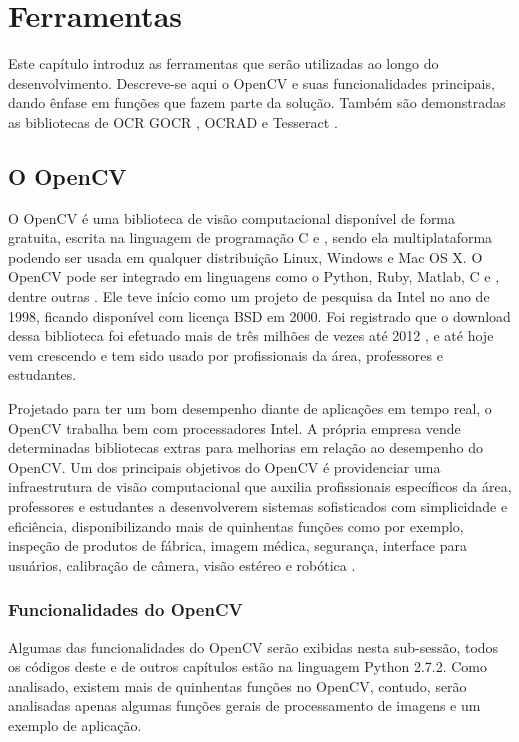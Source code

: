 \chapter{Ferramentas}

Este capítulo introduz as ferramentas que serão utilizadas ao longo do desenvolvimento. Descreve-se aqui o OpenCV e suas funcionalidades principais, dando ênfase em funções que fazem parte da solução. Também são demonstradas as bibliotecas de OCR GOCR \cite{GOCR}, OCRAD \cite{OCRAD} e Tesseract \cite{tesseract-ocr}.

\section{O OpenCV}

O OpenCV é uma biblioteca de visão computacional disponível de forma gratuita, escrita na linguagem de programação C e \cpp, sendo ela multiplataforma podendo ser usada em qualquer distribuição Linux, Windows e Mac OS X. O OpenCV pode ser integrado em linguagens como o Python, Ruby, Matlab, C e \cpp, dentre outras \cite{learningopencv}. Ele teve início como um projeto de pesquisa da Intel \cite{intel} no ano de 1998, ficando disponível com licença BSD em 2000. Foi registrado que o download dessa biblioteca foi efetuado mais de três milhões de vezes até 2012 \cite{pulli2012real}, e até hoje vem crescendo e tem sido usado por profissionais da área, professores e estudantes.

Projetado para ter um bom desempenho diante de aplicações em tempo real, o OpenCV trabalha bem com processadores Intel. A própria empresa vende determinadas bibliotecas extras para melhorias em relação ao desempenho do OpenCV. Um dos principais objetivos do OpenCV é providenciar uma infraestrutura de visão computacional que auxilia profissionais específicos da área, professores e estudantes a desenvolverem sistemas sofisticados com simplicidade e eficiência, disponibilizando mais de quinhentas funções como por exemplo, inspeção de produtos de fábrica, imagem médica, segurança, interface para usuários, calibração de câmera, visão estéreo e robótica \cite{learningopencv}. 

\subsection{Funcionalidades do OpenCV}

Algumas das funcionalidades do OpenCV serão exibidas nesta sub-sessão, todos os códigos deste e de outros capítulos estão na linguagem Python 2.7.2. Como analisado, existem mais de quinhentas funções no OpenCV, contudo, serão analisadas apenas algumas funções gerais de processamento de imagens e um exemplo de aplicação.

